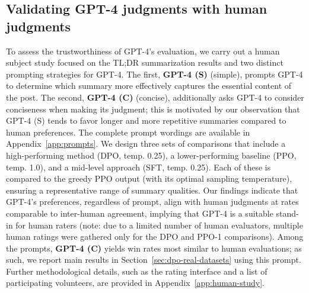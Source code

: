 \subsection{Validating GPT-4 judgments with human judgments}
\label{sec:human-judgments}
To assess the trustworthiness of GPT-4's evaluation, we carry out a human subject study focused on the TL;DR summarization results and two distinct prompting strategies for GPT-4. The first, \textbf{GPT-4 (S)} (simple), prompts GPT-4 to determine which summary more effectively captures the essential content of the post. The second, \textbf{GPT-4 (C)} (concise), additionally asks GPT-4 to consider conciseness when making its judgment; this is motivated by our observation that GPT-4 (S) tends to favor longer and more repetitive summaries compared to human preferences. The complete prompt wordings are available in Appendix~\ref{app:prompts}. We design three sets of comparisons that include a high-performing method (DPO, temp. 0.25), a lower-performing baseline (PPO, temp. 1.0), and a mid-level approach (SFT, temp. 0.25). Each of these is compared to the greedy PPO output (with its optimal sampling temperature), ensuring a representative range of summary qualities. Our findings indicate that GPT-4’s preferences, regardless of prompt, align with human judgments at rates comparable to inter-human agreement, implying that GPT-4 is a suitable stand-in for human raters (note: due to a limited number of human evaluators, multiple human ratings were gathered only for the DPO and PPO-1 comparisons). Among the prompts, \textbf{GPT-4 (C)} yields win rates most similar to human evaluations; as such, we report main results in Section~\ref{sec:dpo-real-datasets} using this prompt. Further methodological details, such as the rating interface and a list of participating volunteers, are provided in Appendix~\ref{app:human-study}.

